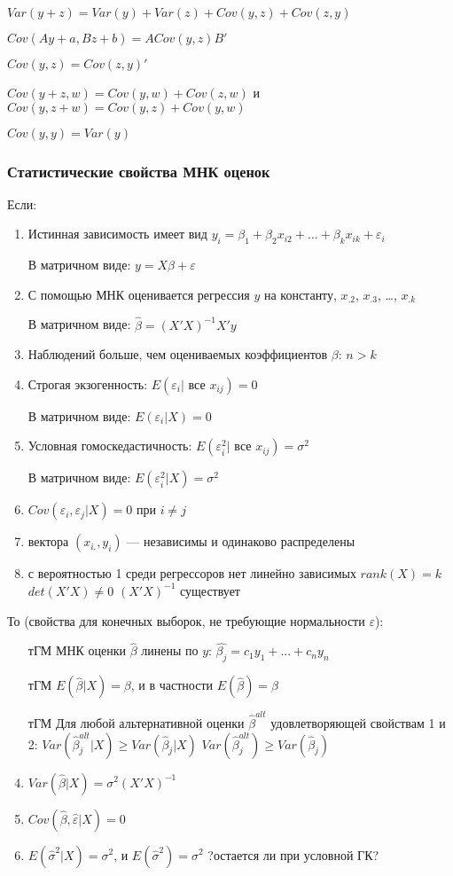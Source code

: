 \documentclass[]{article}
\begin{document}
$Var(y+z)=Var(y)+Var(z)+Cov(y,z)+Cov(z,y)$

$Cov(Ay+a,Bz+b)=ACov(y,z)B'$

$Cov(y,z)=Cov(z,y)'$

$Cov(y+z,w)=Cov(y,w)+Cov(z,w)$ и $Cov(y,z+w)=Cov(y,z)+Cov(y,w)$

$Cov(y,y)=Var(y)$

\subsubsection{Статистические свойства МНК оценок}\label{---}

Если:

\begin{enumerate}
\item Истинная зависимость имеет вид $y_i=\beta_1 + \beta_2 x_{i2} + \ldots + \beta_k x_{ik}+\varepsilon_i$

В матричном виде: $y=X\beta + \varepsilon$
\item С помощью МНК оценивается регрессия $y$ на константу, $x_{.2}$, $x_{.3}$, \ldots, $x_{.k}$

В матричном виде: $\hat{\beta}=(X'X)^{-1}X'y$
\item Наблюдений больше, чем оцениваемых коэффициентов $\beta$: $n>k$
\item Строгая экзогенность: $E(\varepsilon_i | \text{ все } x_{ij})=0$

В матричном виде: $E(\varepsilon_i | X)=0$
\item Условная гомоскедастичность: $E(\varepsilon_i^2 | \text{ все } x_{ij})=\sigma^2$

В матричном виде: $E(\varepsilon_i^2 | X)=\sigma^2$
\item  $Cov(\varepsilon_i,\varepsilon_j | X)=0$ при $i \neq j$
\item  вектора $(x_{i.},y_i)$ --- независимы и одинаково распределены
\item  с вероятностью 1 среди регрессоров нет линейно зависимых
$rank(X)=k$
$det(X'X)\neq 0$
$(X'X)^{-1}$ существует
\end{enumerate}

То (свойства для конечных выборок, не требующие нормальности
$\varepsilon$):

\begin{enumerate}
\item [тГМ] МНК оценки $\hat{\beta}$ линены по $y$:
$\hat{\beta_j}=c_1 y_1 + ... + c_n y_n$
\item  [тГМ] $E(\hat{\beta} |X )=\beta$, и в частности $E(\hat{\beta})=\beta$
\item  [тГМ] Для любой альтернативной оценки $\hat{\beta}^{alt}$ удовлетворяющей свойствам 1 и 2:
$Var(\hat{\beta}_j^{alt} | X)\geq Var(\hat{\beta}_j | X)$
$Var(\hat{\beta}_j^{alt} )\geq Var(\hat{\beta}_j )$
\item  $Var(\hat{\beta} | X )=\sigma^2 (X'X)^{-1}$
\item $Cov(\hat{\beta},\hat{\varepsilon} | X)=0$
\item  $E(\hat{\sigma}^2 |X ) = \sigma^2$, и $E(\hat{\sigma}^2 ) = \sigma^2$ ?остается ли при условной ГК?
\end{enumerate}
\end{document}
